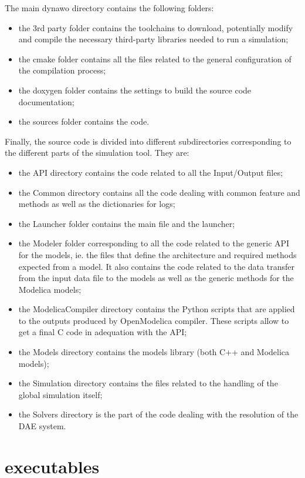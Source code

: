 \documentclass[a4paper, 12pt]{report}
\begin{document}
The main dynawo directory contains the following folders:
\begin{itemize}
\item the 3rd party folder contains the toolchains to download, potentially
modify and compile the necessary third-party libraries needed to run a \Dynawo
simulation;
\item the cmake folder contains all the files related to the general
configuration of the compilation process;
\item the doxygen folder contains the \Dynawo settings to build the source code
documentation;
\item the sources folder contains the \Dynawo code.
\end{itemize}

Finally, the source code is divided into different subdirectories corresponding to the different parts of the \Dynawo simulation tool. They are:
\begin{itemize}
\item the API directory contains the code related to all the Input/Output
files;
\item the Common directory contains all the code dealing with common feature and methods as well as the dictionaries for logs;
\item the Launcher folder contains the main file and the launcher;
\item the Modeler folder corresponding to all the code related to the generic
API for the models, ie. the files that define the architecture and required
methods expected from a model. It also contains the code related to the data transfer from the input data file to the models as well as the generic methods for the Modelica models;
\item the ModelicaCompiler directory contains the Python scripts that are
applied to the outputs produced by OpenModelica compiler. These scripts allow to
get a final C code in adequation with the \Dynawo API;
\item the Models directory contains the \Dynawo models library (both C++ and
Modelica models);
\item the Simulation directory contains the files related to the handling
of the global simulation itself;
\item the Solvers directory is the part of the code dealing with the resolution of the DAE system.
\end{itemize}

\section{\Dynawo executables}
\label{Dynawo_Advanced_Documentation_Dynawo_executables}
\end{document}
